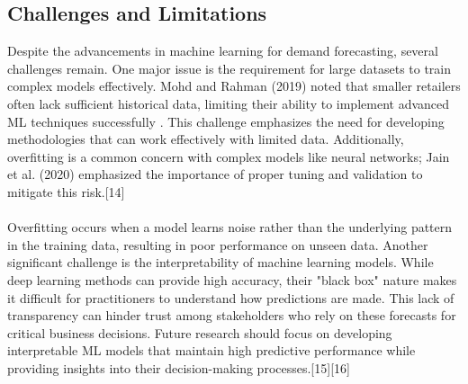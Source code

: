 \documentclass[10pt]{report}
\begin{document}
\begin{center}
\subsection{Challenges and Limitations}\label{AA}
Despite the advancements in machine learning for demand forecasting, several challenges remain. One major issue is the requirement for large datasets to train complex models effectively. Mohd and Rahman (2019) noted that smaller retailers often lack sufficient historical data, limiting their ability to implement advanced ML techniques successfully . This challenge emphasizes the need for developing methodologies that can work effectively with limited data.
Additionally, overfitting is a common concern with complex models like neural networks; Jain et al. (2020) emphasized the importance of proper tuning and validation to mitigate this risk.[14]\\
\\
Overfitting occurs when a model learns noise rather than the underlying pattern in the training data, resulting in poor performance on unseen data.
Another significant challenge is the interpretability of machine learning models. While deep learning methods can provide high accuracy, their "black box" nature makes it difficult for practitioners to understand how predictions are made. This lack of transparency can hinder trust among stakeholders who rely on these forecasts for critical business decisions. Future research should focus on developing interpretable ML models that maintain high predictive performance while providing insights into their decision-making processes.[15][16]

\end{center}
\end{document}
